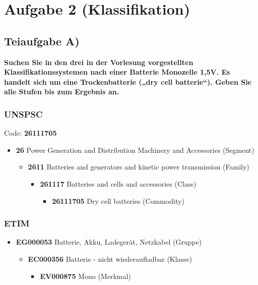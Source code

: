 \section{Aufgabe 2 (Klassifikation)}

\subsection{Teiaufgabe A)}
\textbf{Suchen Sie in den drei in der Vorlesung vorgestellten Klassifikationssystemen nach einer
Batterie Monozelle 1,5V. Es handelt sich um eine Trockenbatterie („dry cell batterie“).
Geben Sie alle Stufen bis zum Ergebnis an.}

\subsubsection{UNSPSC}
Code: \textbf{26111705}

\begin{itemize}
  \item \textbf{26} Power Generation and Distribution Machinery and Accessories
  (Segment)
	\begin{itemize}
	  \item  \textbf{2611} Batteries and generators and kinetic power transmission
	  (Family)
	  \begin{itemize}
	    \item \textbf{261117} Batteries and cells and accessories (Class)
	    \begin{itemize}
	      \item  \textbf{26111705} Dry cell batteries (Commodity)
	      \end{itemize}
	   \end{itemize}
	\end{itemize}
\end{itemize}

\subsubsection{ETIM}

\begin{itemize} 
  \item  \textbf{EG000053} Batterie, Akku, Ladegerät, Netzkabel (Gruppe)
  \begin{itemize}
    \item \textbf{EC000356} Batterie - nicht wiederaufladbar (Klasse)
    \begin{itemize}
      \item  \textbf{EV000875} Mono (Merkmal)
      \end{itemize}
   \end{itemize}
\end{itemize}


